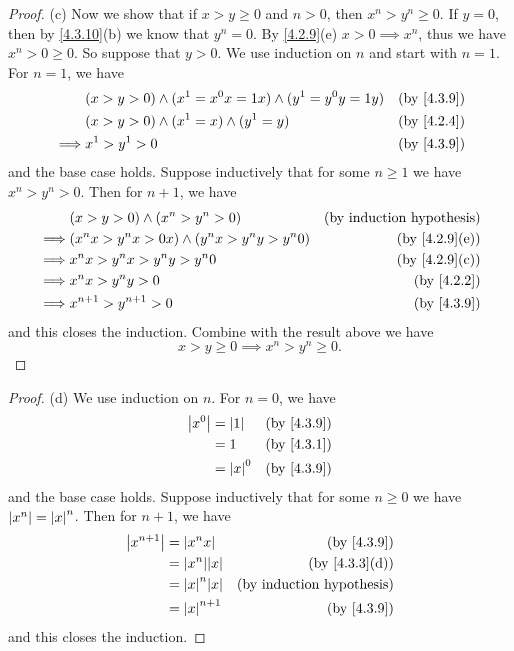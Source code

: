 \begin{proof}{(c)}
  Now we show that if \(x > y \geq 0\) and \(n > 0\), then \(x^n > y^n \geq 0\).
  If \(y = 0\), then by \cref{4.3.10}(b) we know that \(y^n = 0\).
  By \cref{4.2.9}(e) \(x > 0 \implies x^n\), thus we have \(x^n > 0 \geq 0\).
  So suppose that \(y > 0\).
  We use induction on \(n\) and start with \(n = 1\).
  For \(n = 1\), we have
  \begin{align*}
             & (x > y > 0) \land (x^1 = x^0 x = 1x) \land (y^1 = y^0 y = 1y) & \text{(by \cref{4.3.9})} \\
             & (x > y > 0) \land (x^1 = x) \land (y^1 = y)                   & \text{(by \cref{4.2.4})} \\
    \implies & x^1 > y^1 > 0                                                 & \text{(by \cref{4.3.9})}
  \end{align*}
  and the base case holds.
  Suppose inductively that for some \(n \geq 1\) we have \(x^n > y^n > 0\).
  Then for \(n + 1\), we have
  \begin{align*}
             & (x > y > 0) \land (x^n > y^n > 0)                  & \text{(by induction hypothesis)} \\
    \implies & (x^n x > y^n x > 0x) \land (y^n x > y^n y > y^n 0) & \text{(by \cref{4.2.9}(e))}      \\
    \implies & x^n x > y^n x > y^n y > y^n 0                      & \text{(by \cref{4.2.9}(c))}      \\
    \implies & x^n x > y^n y > 0                                  & \text{(by \cref{4.2.2})}         \\
    \implies & x^{n + 1} > y^{n + 1} > 0                          & \text{(by \cref{4.3.9})}
  \end{align*}
  and this closes the induction.
  Combine with the result above we have
  \[
    x > y \geq 0 \implies x^n > y^n \geq 0.
  \]
\end{proof}

\begin{proof}{(d)}
  We use induction on \(n\).
  For \(n = 0\), we have
  \begin{align*}
    \abs{x^0} & = \abs{1}   & \text{(by \cref{4.3.9})} \\
              & = 1         & \text{(by \cref{4.3.1})} \\
              & = \abs{x}^0 & \text{(by \cref{4.3.9})}
  \end{align*}
  and the base case holds.
  Suppose inductively that for some \(n \geq 0\) we have \(\left\lvert x^n\right\rvert = \left\lvert x\right\rvert^n\).
  Then for \(n + 1\), we have
  \begin{align*}
    \abs{x^{n + 1}} & = \abs{x^n x}       & \text{(by \cref{4.3.9})}         \\
                    & = \abs{x^n} \abs{x} & \text{(by \cref{4.3.3}(d))}      \\
                    & = \abs{x}^n \abs{x} & \text{(by induction hypothesis)} \\
                    & = \abs{x}^{n + 1}   & \text{(by \cref{4.3.9})}
  \end{align*}
  and this closes the induction.
\end{proof}

